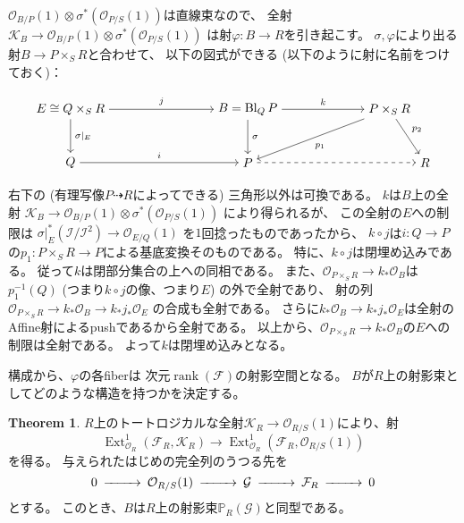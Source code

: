 \documentclass[uplatex]{jsarticle}
\theoremstyle{definition}
\newtheorem{thm}{Theorem}%
\DeclareMathOperator{\rank}{\mathrm{rank}}
\DeclareMathOperator{\Ext}{\mathrm{Ext}}
\DeclareMathOperator{\Bl}{\mathrm{Bl}}
\renewcommand{\P}{\mathbb{P}}
\newcommand{\mcF}{\mathcal{F}}
\newcommand{\mcG}{\mathcal{G}}
\newcommand{\mcI}{\mathcal{I}}
\newcommand{\mcK}{\mathcal{K}}
\newcommand{\mcO}{\mathcal{O}}
\newcommand{\OOO}{\mcO}
\newcommand{\OB}{\OOO_B}
\renewcommand{\OE}{\OOO_E}
\newcommand{\OR}{\OOO_R}
\newcommand{\OO}[1]{\OOO_{#1}}
\newcommand{\dto}{\dashrightarrow}
\newcommand{\HereBeginTikz}{}
\newcommand{\HereEndTikz}{}
\begin{document}
\(\OO{B/P}(1)\otimes \sigma^*(\OO{P/S}(1))\)は直線束なので、
全射\(\mcK_B\to \OO{B/P}(1)\otimes \sigma^*(\OO{P/S}(1))\)
は射\(\varphi:B\to R\)を引き起こす。
\(\sigma, \varphi\)により出る射\(B\to P\times_S R\)と合わせて、
以下の図式ができる (以下のように射に名前をつけておく)：
\HereBeginTikz
\[
\begin{tikzpicture}[auto]
  \node (B) at (0,1.5) {\(E \cong Q\times_SR\)};
  \node (A) at (0,0) {\(Q\)};
  \node (B') at (5,1.5) {\(B = \Bl_QP\)};
  \node (A') at (5,0) {\(P\)};
  \node (B'') at (9,1.5) {\(P\times_SR\)};
  \node (A'') at (10,0) {\(R\)};
  \draw[->] (B) to node{\scriptsize \(\sigma|_E\)} (A);
  \draw[->] (B) to node{\scriptsize \(j\)} (B');
  \draw[->] (B') to node{\scriptsize \(\sigma\)} (A');
  \draw[->] (A) to node{\scriptsize \(i\)} (A');
  \draw[->] (B') to node{\scriptsize \(k\)} (B'');
  \draw[->] (B'') to node{\scriptsize \(p_1\)} (A');
  \draw[->] (B'') to node{\scriptsize \(p_2\)} (A'');
  \draw[->,dashed] (A') to (A'');
\end{tikzpicture}
\]
\HereEndTikz
右下の (有理写像\(P\dto R\)によってできる) 三角形以外は可換である。
\(k\)は\(B\)上の全射
\(\mcK_B\to \OO{B/P}(1)\otimes \sigma^*(\OO{P/S}(1))\)
により得られるが、
この全射の\(E\)への制限は
\(\sigma|_E^*(\mcI/\mcI^2)\to \OO{E/Q}(1)\)
を\(1\)回捻ったものであったから、
\(k\circ j\)は\(i:Q\to P\)の\(p_1:P\times_SR \to P\)による基底変換そのものである。
特に、\(k\circ j\)は閉埋め込みである。
従って\(k\)は閉部分集合の上への同相である。
また、\(\OO{P\times_SR}\to k_*\OB\)は\(p_1^{-1}(Q)\)
(つまり\(k\circ j\)の像、つまり\(E\)) の外で全射であり、
射の列
\(\OO{P\times_SR}\to k_*\OB \to k_*j_*\OE\)
の合成も全射である。
さらに\(k_*\OB \to k_*j_*\OE\)は全射のAffine射によるpushであるから全射である。
以上から、\(\OO{P\times_SR}\to k_*\OB\)の\(E\)への制限は全射である。
よって\(k\)は閉埋め込みとなる。

構成から、\(\varphi\)の各fiberは
次元\(\rank(\mcF)\)の射影空間となる。
\(B\)が\(R\)上の射影束としてどのような構造を持つかを決定する。


\begin{thm}\label{thm: main}
  \(R\)上のトートロジカルな全射\(\mcK_R\to \OO{R/S}(1)\)により、射
  \[
  \Ext^1_{\OR}(\mcF_R,\mcK_R) \to
  \Ext^1_{\OR}(\mcF_R,\OO{R/S}(1))
  \]
  を得る。
  与えられたはじめの完全列のうつる先を
  \[
  \begin{CD}
    0 @>>> \OO{R/S}(1) @>>> \mcG @>>> \mcF_R @>>> 0
  \end{CD}
  \]
  とする。
  このとき、\(B\)は\(R\)上の射影束\(\P_R(\mcG)\)と同型である。
\end{thm}
\end{document}
